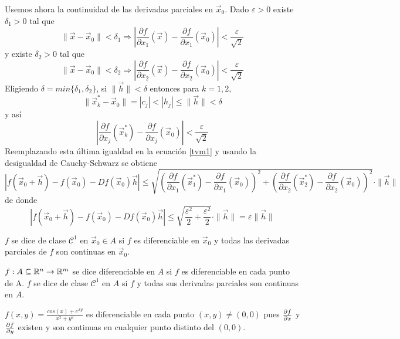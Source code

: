\begin{demostracion}
Usemos ahora la continuidad de las derivadas parciales en $\vec{x}_0$.
Dado $\varepsilon>0$ existe $\delta_1>0$ tal que
$$\|\vec{x}-\vec{x}_0\|<\delta_1\Rightarrow \left|\frac{\partial f}{\partial x_1}(\vec{x})-\frac{\partial f}{\partial x_1}(\vec{x}_0)\right|<\frac{\varepsilon}{\sqrt{2}}$$
y existe  $\delta_2>0$ tal que
$$\|\vec{x}-\vec{x}_0\|<\delta_2\Rightarrow \left|\frac{\partial f}{\partial x_2}(\vec{x})-
\frac{\partial f}{\partial x_2}(\vec{x}_0)\right|<\frac{\varepsilon}{\sqrt{2}}$$
Eligiendo  $\delta=min\{\delta_1,\delta_2\}$, si $\|\vec{h}\|<\delta$ entonces
para $k=1,2,$
$$\|\vec{x}_k^*-\vec{x}_0\|=|c_j|<|h_j|\leq \|\vec{h}\|<\delta$$ 
y as\'i
$$\left|\frac{\partial f}{\partial x_j}(\vec{x}_k^*)-\frac{\partial f}{\partial x_j}(\vec{x}_0)\right|<\frac{\varepsilon}{\sqrt{2}}$$
Reemplazando esta \'ultima igualdad en la ecuaci\'on \eqref{tvm1} y  usando la desigualdad de 
Cauchy-Schwarz se obtiene 
\begin{equation*}
|f(\vec{x}_0+\vec{h})-f(\vec{x}_0)-Df(\vec{x}_0)\vec{h}| \leq
\sqrt{\left(\frac{\partial f}{\partial x_1}(\vec{x}_1^*)-
\frac{\partial f}{\partial x_1}
(\vec{x}_0)\right)^2+\left(\frac{\partial f}{\partial x_2}(\vec{x}_2^*)-
\frac{\partial f}{\partial x_2}(\vec{x}_0)\right)^2}\cdot \|\vec{h}\|
\end{equation*}
de donde
$${|f(\vec{x}_0+\vec{h})-f(\vec{x}_0)-Df(\vec{x}_0)\vec{h}|}\le 
\sqrt{\frac{\varepsilon^2}{2}+\frac{\varepsilon^2}{2}}\cdot \|\vec{h}\|=\varepsilon\|\vec{h}\|$$
\end{demostracion}

\begin{definicion} 
$f$ se dice de clase $\mathcal{C}^1$  en $\vec{x}_0\in A$ si $f$ es 
diferenciable en $\vec{x}_0$ y todas las derivadas parciales de $f$ son continuas en $\vec{x}_0$.
\end{definicion}

\begin{definicion} 
$f:A\subseteq\mathbb{R}^n\to\mathbb{R}^m$ se dice diferenciable en $A$ si $f$ es diferenciable
en cada punto de A. $f$ se dice de clase $\mathcal{C}^1$ en $A$ si $f$ y todas sus derivadas
parciales son continuas en $A$.
\end{definicion}

\begin{ejemplo} $f(x,y)=\frac{cos(x)+e^{xy}}{x^2+y^2}$ es diferenciable en cada punto $(x,y)\neq (0,0)$ pues $\frac{\partial f}{\partial x}$ y $\frac{\partial f}{\partial y}$ existen y son continuas en cualquier punto distinto del $(0,0)$.
\end{ejemplo} 

